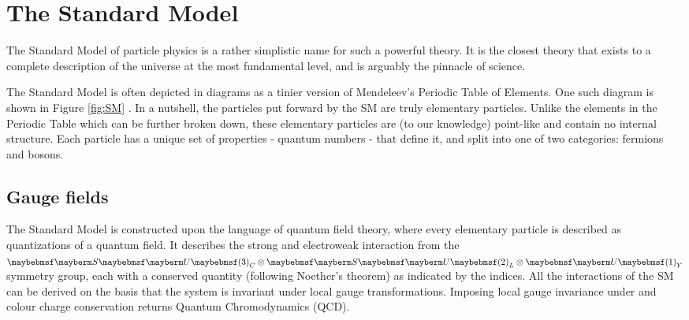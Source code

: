 
\chapter{The Standard Model}
\label{chap:theory}

The Standard Model of particle physics is a rather simplistic name for such a powerful theory. It is the closest theory that exists to a complete description of the universe at the most fundamental level, and is arguably the pinnacle of science. 

The Standard Model is often depicted in diagrams as a tinier version of Mendeleev's Periodic Table of Elements. One such diagram is shown in Figure \ref{fig:SM} . In a nutshell, the particles put forward by the SM are truly elementary particles. Unlike the elements in the Periodic Table which can be further broken down, these elementary particles are (to our knowledge) point-like and contain no internal structure. Each particle has a unique set of properties - quantum numbers - that define it, and split into one of two categories: fermions and bosons. 

%

\section{Gauge fields}

The Standard Model is constructed upon the language of quantum field theory, where every elementary particle is described as quantizations  of a quantum field. It describes the strong and electroweak interaction from the $\SUgroup3_C\otimes\SUgroup2_L\otimes\Ugroup1_Y$ symmetry group, each with a conserved quantity (following Noether's theorem) as indicated by the indices. All the interactions of the SM can be derived on the basis that the system is invariant under local gauge transformations. Imposing local gauge invariance under  and colour charge conservation returns Quantum Chromodynamics (QCD). 

